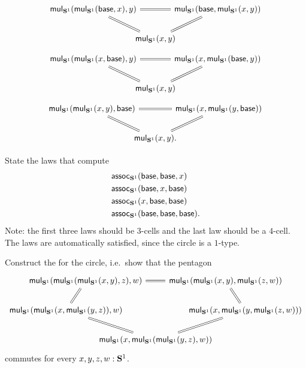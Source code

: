 \begin{exercises}
\begin{subexenum}
    \begin{equation*}
      \begin{tikzcd}[column sep=-1em]
        \mulcircle(\mulcircle(\base,x),y) \arrow[rr,equals] \arrow[dr,equals] & & \mulcircle(\base,\mulcircle(x,y)) \arrow[dl,equals] \\
        & \mulcircle(x,y)
      \end{tikzcd}
    \end{equation*}
    \begin{equation*}
      \begin{tikzcd}[column sep=-1em]
        \mulcircle(\mulcircle(x,\base),y) \arrow[rr,equals] \arrow[dr,equals] & & \mulcircle(x,\mulcircle(\base,y)) \arrow[dl,equals] \\
        & \mulcircle(x,y)
      \end{tikzcd}
    \end{equation*}
    \begin{equation*}
      \begin{tikzcd}[column sep=-1em]
        \mulcircle(\mulcircle(x,y),\base) \arrow[rr,equals] \arrow[dr,equals] & & \mulcircle(x,\mulcircle(y,\base)) \arrow[dl,equals] \\
        & \mulcircle(x,y).
      \end{tikzcd}
    \end{equation*}
  \item State the laws that compute
    \begin{align*}
      & \mathsf{assoc}_{\mathbf{S}^{1}}(\mathsf{base},\mathsf{base},x) \\
      & \mathsf{assoc}_{\mathbf{S}^{1}}(\mathsf{base},x,\mathsf{base}) \\
      & \mathsf{assoc}_{\mathbf{S}^{1}}(x,\mathsf{base},\mathsf{base}) \\
      & \mathsf{assoc}_{\mathbf{S}^{1}}(\mathsf{base},\mathsf{base},\mathsf{base}).
    \end{align*}
    Note: the first three laws should be $3$-cells and the last law should be a $4$-cell. The laws are automatically satisfied, since the circle is a $1$-type.
  \end{subexenum}
  \exercise Construct the  for the circle, i.e.~show that the pentagon
  \begin{equation*}
    \begin{tikzcd}[column sep=-6em]
      &[-6em] \mulcircle(\mulcircle(\mulcircle(x,y),z),w) \arrow[rr,equals] \arrow[dl,equals] & & \mulcircle(\mulcircle(x,y),\mulcircle(z,w)) \arrow[dr,equals] &[-6em] \\
      \mulcircle(\mulcircle(x,\mulcircle(y,z)),w) \arrow[drr,equals] & & & & \mulcircle(x,\mulcircle(y,\mulcircle(z,w))) \\
      & & \mulcircle(x,\mulcircle(\mulcircle(y,z),w)) \arrow[urr,equals]
    \end{tikzcd}
  \end{equation*}
  commutes for every $x,y,z,w:\mathbf{S}^{1}$.
\end{exercises}

